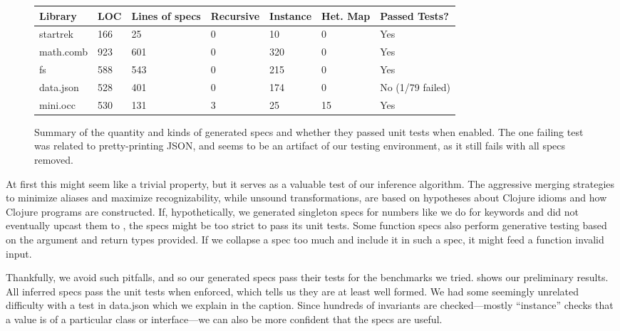 \begin{figure*}
\begin{tabular}
{|         l   || l   | l || l  | l  | l || l |}
  Library       & LOC  &  Lines of specs  & Recursive & Instance & Het. Map & Passed Tests?\\ 
  \hline
  \hline
  startrek      & 166  &  25  & 0  & 10   & 0  & Yes\\
  math.comb     & 923  &  601 & 0  & 320  & 0  & Yes\\
  fs            & 588  &  543 & 0  & 215  & 0  & Yes\\
  data.json     & 528  &  401 & 0  & 174  & 0  & No (1/79 failed)\\ %
  mini.occ      & 530  &  131 & 3  & 25   & 15 & Yes\\
\end{tabular}
  \caption{Summary of the quantity and kinds of generated specs and whether they passed
  unit tests when enabled.
  The one failing test was related to pretty-printing JSON, and seems to be an artifact
  of our testing environment, as it still fails with all specs removed.
  }
\label{infer:fig:genspec}
\end{figure*}


At first this might seem like a trivial property, but it serves as
a valuable test of our inference algorithm.
The aggressive merging strategies to minimize aliases and
maximize recognizability, while unsound transformations,
are based on hypotheses about Clojure idioms and how
Clojure programs are constructed.
If, hypothetically, we generated singleton specs for numbers
like we do for keywords and did not eventually upcast
them to , the specs might be too strict
to pass its unit tests.
Some function specs also perform generative testing based on
the argument and return types provided.
If we collapse a spec too much and include it in such
a spec, it might feed a function invalid input.

Thankfully, we avoid such pitfalls, and so
our generated specs pass their tests for the benchmarks
we tried.
 shows
our preliminary results. All inferred specs pass the unit
tests when enforced, which tells us they are at least well formed.
We had some seemingly unrelated difficulty with a test in data.json which we explain
in the caption.
Since hundreds of invariants are checked---mostly ``instance'' checks that a value is of a particular class or interface---we can also be more confident
that the specs are useful.


